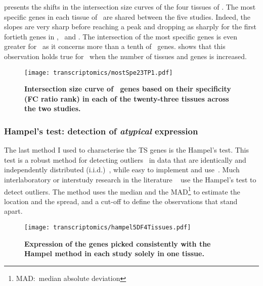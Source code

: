  presents the shifts in the intersection size curves of the
four tissues of \setOne.
The most specific genes in each tissue of \setOne\ are shared between the
five studies.
Indeed, the slopes are very sharp before reaching a peak and dropping as sharply
for the first fortieth genes in \heart, \kidney\ and \liver.
The intersection of the most specific genes is even greater for \testis\ as
it concerns more than a tenth of \setOne\ genes.
 shows that this observation holds true for \setTwo\
when the number of tissues and genes is increased.\mybr\

\begin{figure}[!htbp]
    \texttt{[image: transcriptomics/mostSpe23TP1.pdf]}\centering
    \vspace{-0.2in}
    \caption[Intersection size curve of \setTwo\ genes based on their FC ratio
    rank in each tissue across the two studies]{\label{fig:mostSpe23T}\textbf{Intersection
    size curve of \setTwo\ genes based on their specificity (FC ratio rank)
    in each of the twenty-three tissues across the two studies.}
    }
\end{figure}

\subsubsection{Hampel's test: detection of \emph{atypical} expression}\label{subsub:Hampel}

The last method I used to characterise the \gls{TS} genes is the Hampel's test.
This test is a robust method
for detecting outliers~
in data that are identically and independently distributed (i.i.d.)~,
while easy to implement and use~\mycite{LinsingerHampel}.
Much interlaboratory or interstudy research in the literature
\eg~\citet{LinsingerHampel,Lewczuk2006-wq,Rocke1983-qa,Apfalter1999-ca}
use the Hampel's test to detect outliers.
The method uses the median and the \gls{MAD}\footnote{MAD:~median absolute deviation}
to estimate the location and the spread,
and a cut-off to define the observations that stand apart.\mybr\

\begin{figure}[!htb]
    \texttt{[image: transcriptomics/hampel5DF4Tissues.pdf]}\centering
    \caption[Expression of the genes picked with Hampel method]{\label{fig:hampelExp}%
    \textbf{Expression of the genes picked consistently with the Hampel method
    in each study solely in one tissue.}}
\end{figure}

